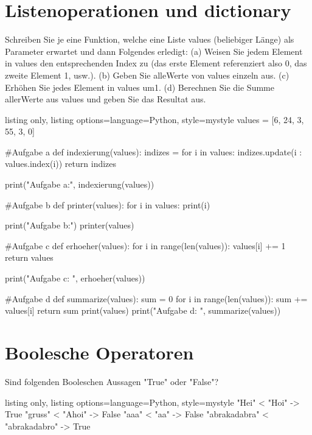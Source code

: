 \documentclass[11pt, oneside]{book}
\begin{document}
\section{Listenoperationen und dictionary}
Schreiben Sie je eine Funktion, welche eine Liste values (beliebiger Länge) als Parameter erwartet und dann Folgendes erledigt:
(a) Weisen Sie jedem Element in values den entsprechenden Index zu (das erste Element referenziert also 0, das zweite Element 1, usw.).
(b) Geben Sie alleWerte von values einzeln aus.
(c) Erhöhen Sie jedes Element in values um1.
(d) Berechnen Sie die Summe allerWerte aus values und geben Sie das Resultat aus.
\begin{tcblisting}{listing only, listing options={language=Python, style=mystyle}}
values = [6, 24, 3, 55, 3, 0]

#Aufgabe a
def indexierung(values):
    indizes = {}
    for i in values:
        indizes.update({i : values.index(i)})
    return indizes

print("Aufgabe a:", indexierung(values))

#Aufgabe b
def printer(values):
    for i in values:
        print(i)

print("Aufgabe b:")
printer(values)

#Aufgabe c
def erhoeher(values):
    for i in range(len(values)):
        values[i] += 1
    return values

print("Aufgabe c: ", erhoeher(values))

#Aufgabe d
def summarize(values):
    sum = 0
    for i in range(len(values)):
        sum += values[i]
    return sum
print(values)
print("Aufgabe d: ", summarize(values))
\end{tcblisting}

\section{Boolesche Operatoren}
Sind folgenden Booleschen Aussagen "True" oder "False"?
\begin{tcblisting}{listing only, listing options={language=Python, style=mystyle}}
"Hei" < "Hoi" -> True
"gruss" < "Ahoi" -> False
"aaa" < "aa" -> False
"abrakadabra" < "abrakadabro" -> True
\end{tcblisting}
\end{document}
